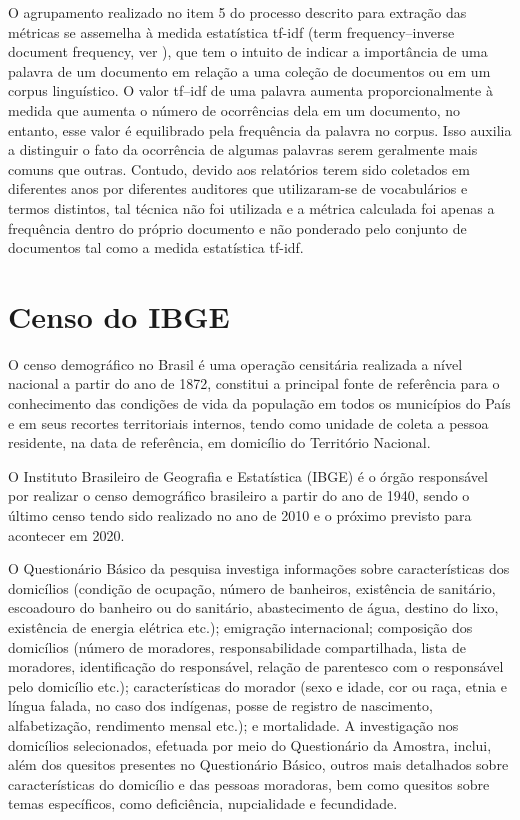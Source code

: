 O agrupamento realizado no item 5 do processo descrito para extração das métricas se assemelha à medida estatística tf-idf (term frequency–inverse document frequency, ver \citet{Jones1972}), que tem o intuito de indicar a importância de uma palavra de um documento em relação a uma coleção de documentos ou em um corpus linguístico. O valor tf–idf de uma palavra aumenta proporcionalmente à medida que aumenta o número de ocorrências dela em um documento, no entanto, esse valor é equilibrado pela frequência da palavra no corpus. Isso auxilia a distinguir o fato da ocorrência de algumas palavras serem geralmente mais comuns que outras. Contudo, devido aos relatórios terem sido coletados em diferentes anos por diferentes auditores que utilizaram-se de vocabulários e termos distintos, tal técnica não foi utilizada e a métrica calculada foi apenas a frequência dentro do próprio documento e não ponderado pelo conjunto de documentos tal como a medida estatística tf-idf.

\section{Censo do IBGE}
\label{sec:censo_do_ibge}

O censo demográfico no Brasil é uma operação censitária realizada a nível nacional a partir do ano de 1872, constitui a principal fonte de referência para o conhecimento das condições de vida da população em todos os municípios do País e em seus recortes territoriais internos, tendo como unidade de coleta a pessoa residente, na data de referência, em domicílio do Território Nacional.

O Instituto Brasileiro de Geografia e Estatística (IBGE) é o órgão responsável por realizar o censo demográfico brasileiro a partir do ano de 1940, sendo o último censo tendo sido realizado no ano de 2010 e o próximo previsto para acontecer em 2020.

O Questionário Básico da pesquisa investiga informações sobre características dos domicílios (condição de ocupação, número de banheiros, existência de sanitário, escoadouro do banheiro ou do sanitário, abastecimento de água, destino do lixo, existência de energia elétrica etc.); emigração internacional; composição dos domicílios (número de moradores, responsabilidade compartilhada, lista de moradores, identificação do responsável, relação de parentesco com o responsável pelo domicílio etc.); características do morador (sexo e idade, cor ou raça, etnia e língua falada, no caso dos indígenas, posse de registro de nascimento, alfabetização, rendimento mensal etc.); e mortalidade. A investigação nos domicílios selecionados, efetuada por meio do Questionário da Amostra, inclui, além dos quesitos presentes no Questionário Básico, outros mais detalhados sobre características do domicílio e das pessoas moradoras, bem como quesitos sobre temas específicos, como deficiência, nupcialidade e fecundidade.

